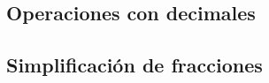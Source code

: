 \documentclass[12pt,addpoints,answers]{repaso}
\begin{document}
\begin{questions}
	\subsection*{Operaciones con decimales}

	\subsection*{Simplificación de fracciones}


\end{questions}
\end{document}
